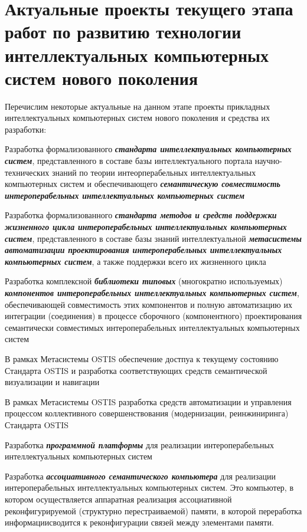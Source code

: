 \section*{Актуальные проекты текущего этапа работ по развитию технологии интеллектуальных компьютерных систем нового поколения}
\label{concl_actual_projects_current_stage_work_development_technology}

Перечислим некоторые актуальные на данном этапе проекты прикладных интеллектуальных компьютерных систем нового поколения и средства их разработки:
\begin{textitemize}
	\item 
	Разработка формализованного \textbf{\textit{стандарта интеллектуальных компьютерных систем}}, представленного в составе базы интеллектуального портала научно-технических знаний по теории интеорперабельных интеллектуальных компьютерных систем и обеспечивающего \textbf{\textit{семантическую совместимость интероперабельных интеллектуальных компьютерных систем}}
	\item 
	Разработка формализованного \textbf{\textit{стандарта методов и средств поддержки жизненного цикла интероперабельных интеллектуальных компьютерных систем}}, представленного в составе базы знаний интеллектуальной \textbf{\textit{метасистемы автоматизации проектирования интероперабельных интеллектуальных компьютерных систем}}, а также поддержки всего их жизненного цикла
	\item 
	Разработка комплексной \textbf{\textit{библиотеки типовых}} (многократно используемых) \textbf{\textit{компонентов интероперабельных интеллектуальных компьютерных систем}}, обеспечивающей совместимость этих компонентов и полную автоматизацию их интеграции (соединения) в процессе сборочного (компонентного) проектирования семантически совместимых интероперабельных интеллектуальных компьютерных систем
	\item 
	В рамках Метасистемы OSTIS обеспечение  достпуа к текущему состоянию Стандарта OSTIS и разработка соответствующих средств семантической визуализации и навигации
	\item 
	В рамках Метасистемы OSTIS разработка средств автоматизации и управления процессом коллективного совершенствования (модернизации, реинжиниринга) Стандарта OSTIS
	\item
	Разработка \textbf{\textit{программной платформы}} для реализации интероперабельных интеллектуальных компьютерных систем
	\item 
	Разработка \textbf{\textit{ассоциативного семантического компьютера}} для реализации интероперабельных интеллектуальных компьютерных систем. Это  компьютер, в котором осуществляется аппаратная реализация ассоциативной реконфигурируемой (структурно перестраиваемой) памяти, в которой переработка информациисводится к реконфигурации связей между элементами памяти.

\end{textitemize}
